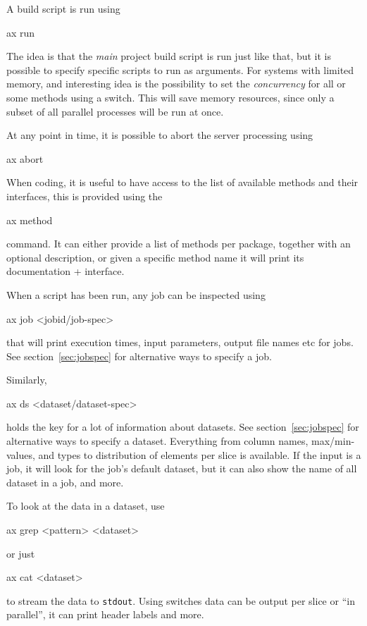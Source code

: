 A build script is run using
\begin{shell}
ax run
\end{shell}
The idea is that the \textsl{main} project build script is run just
like that, but it is possible to specify specific scripts to run as
arguments.  For systems with limited memory, and interesting idea is
the possibility to set the \textsl{concurrency} for all or some
methods using a switch.  This will save memory resources, since only a
subset of all parallel processes will be run at once.

At any point in time, it is possible to abort the server processing
using
\begin{shell}
ax abort
\end{shell}

When coding, it is useful to have access to the list of available
methods and their interfaces, this is provided using the
\begin{shell}
ax method
\end{shell}
command.  It can either provide a list of methods per package,
together with an optional description, or given a specific method name
it will print its documentation + interface.

When a script has been run, any job can be inspected using
\begin{shell}
ax job <jobid/job-spec>
\end{shell}
that will print execution times, input parameters, output file names
etc for jobs.  See section~\ref{sec:jobspec} for alternative ways to
specify a job.

Similarly,
\begin{shell}
ax ds <dataset/dataset-spec>
\end{shell}
holds the key for a lot of information about datasets.  See
section~\ref{sec:jobspec} for alternative ways to specify a dataset.
Everything from column names, max/min-values, and types to
distribution of elements per slice is available.  If the input is a
job, it will look for the job's default dataset, but it can also show
the name of all dataset in a job, and more.

To look at the data in a dataset, use
\begin{shell}
ax grep <pattern> <dataset>
\end{shell}
or just
\begin{shell}
ax cat <dataset>
\end{shell}
to stream the data to \texttt{stdout}.  Using switches data can be
output per slice or ``in parallel'', it can print header labels and
more.

